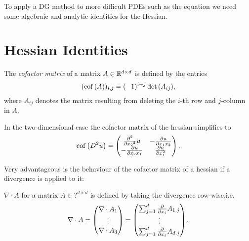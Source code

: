 \newpage

To apply a DG method to more difficult PDEs such as the \MA equation we need some algebraic and analytic identities for the Hessian.
\section{Hessian Identities}

\begin{definition} \label{def: cof matrix}
	The \emph{cofactor matrix} of a matrix $A \in \mathbb{R}^{d \times d}$ is defined by the entries
	\begin{align}
	(\operatorname{cof} \left( A \right) )_{i,j} = (-1)^{i+j} \det{\left(A_{ij}\right)},
	\end{align}
	where $A_{ij}$ denotes the matrix resulting from deleting the $i$-th row and $j$-column in $A$.
\end{definition}

In the two-dimensional case the cofactor matrix of the hessian simplifies to
\begin{align}
\operatorname{cof} \left( D^2 u \right) = \begin{pmatrix}
								\frac {\partial^2} {\partial {x_2}^2} u & -\frac {\partial u}{\partial x_1 x_2} \\
								-\frac {\partial u}{\partial x_2 x_1} & \frac {\partial u}{\partial x_1^2} 
							\end{pmatrix}.
\end{align}


Very advantageous is the behaviour of the cofactor matrix of a hessian if a divergence is applied to it:
\begin{definition}
	$\nabla \cdot A$ for a matrix $A \in ?^{d \times d}$ is defined by taking the divergence row-wise,i.e.
\[
	\nabla \cdot A = \begin{pmatrix} \nabla \cdot A_1 \\ \vdots \\ \nabla \cdot A_d\end{pmatrix}
	= \begin{pmatrix} \sum_{j = 1}^{d} \frac \partial {\partial x_i} A_{1,j} \\ \vdots \\ \sum_{j = 1}^{d} \frac \partial {\partial x_i} A_{d,j}\end{pmatrix}.
\]
	
\end{definition}

